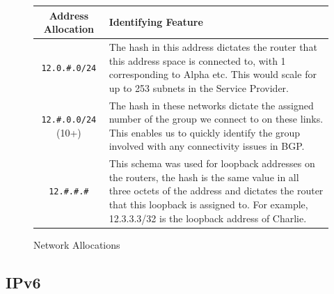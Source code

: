 \begin{figure}[!ht]
    \caption{Network Allocations}
    \label{figure:network-alloc-2}
    \centering
    \begin{tabular}{|c|p{8cm}|}
        \hline
        \textbf{Address Allocation} & \textbf{Identifying Feature} \\

        \hline
        \texttt{12.0.\#.0/24} & The hash in this address dictates the router that
        this address space is connected to, with 1 corresponding to Alpha etc.
        This would scale for up to 253 subnets in the Service Provider.\\

        \hline
        \texttt{12.\#.0.0/24} (10+) & The hash in these networks dictate the assigned
        number of the group we connect to on these links. This enables us to
        quickly identify the group involved with any connectivity issues in
        BGP.\\

        \hline
        \texttt{12.\#.\#.\#} & This schema was used for loopback addresses on the
        routers, the hash is the same value in all three octets of the address
        and dictates the router that this loopback is assigned to. For example,
        12.3.3.3/32 is the loopback address of Charlie.\\
        \hline
    \end{tabular}
\end{figure}
\clearpage

\subsection{IPv6}